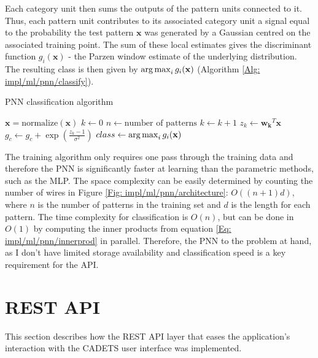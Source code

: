 	Each category unit then sums the outputs of the pattern units connected to it. Thus, each pattern unit contributes to its associated category unit a signal equal to the probability the test pattern $\mathbf{x}$ was generated by a Gaussian centred on the associated training point. The sum of these local estimates gives the discriminant function $g_i(\mathbf{x})$ - the Parzen window estimate of the underlying distribution. The resulting class is then given by $\operatorname*{arg\,max}_i g_i(\mathbf{x})$ (Algorithm \ref{Alg: impl/ml/pnn/classify}). 
	\begin{algorithm}[H]
	\caption{PNN classification algorithm}
	\label{Alg: impl/ml/pnn/classify}
	\begin{algorithmic}[H]
		\State $\mathbf{x} = \text{normalize}(\mathbf{x})$
		\State $k \gets 0$
		\State $n \gets \text{number of patterns}$ 
			\Do
				\State $k \gets k + 1$
				\State $z_k \gets \mathbf{w_k}^T\mathbf{x}$
					\State $g_c \gets g_c + \exp(\frac{z_k - 1}{\sigma^2})$
				\EndIf
		\State $class \gets \operatorname*{arg\,max}_i g_i(\mathbf{x})$ \\
		\EndProcedure
	\end{algorithmic}
	\end{algorithm}
	The training algorithm only requires one pass through the training data and therefore the PNN is significantly faster at learning than the parametric methods, such as the MLP. The space complexity can be easily determined by counting the number of wires in Figure \ref{Fig: impl/ml/pnn/architecture}: $O((n+1)d)$, where $n$ is the number of patterns in the training set and $d$ is the length for each pattern. The time complexity for classification is $O(n)$, but can be done in $O(1)$ by computing the inner products from equation \ref{Eq: impl/ml/pnn/innerprod} in parallel. Therefore, the PNN to the problem at hand, as I don't have limited storage availability and classification speed is a key requirement for the API. 
	\section{REST API} \label{Section: impl/REST}
	This section describes how the REST API layer that eases the application's interaction with the CADETS user interface was implemented.
